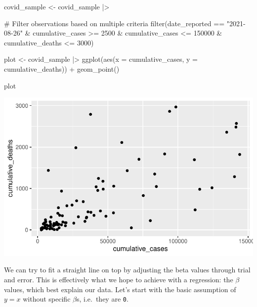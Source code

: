 \documentclass[
  letterpaper,
]{krantz}
\makeatletter
\newenvironment{Shaded}{\begin{snugshade}}{\end{snugshade}}
\newcommand{\AttributeTok}[1]{\textcolor[rgb]{0.40,0.45,0.13}{#1}}
\newcommand{\CommentTok}[1]{\textcolor[rgb]{0.37,0.37,0.37}{#1}}
\newcommand{\DecValTok}[1]{\textcolor[rgb]{0.68,0.00,0.00}{#1}}
\newcommand{\FunctionTok}[1]{\textcolor[rgb]{0.28,0.35,0.67}{#1}}
\newcommand{\NormalTok}[1]{\textcolor[rgb]{0.00,0.23,0.31}{#1}}
\newcommand{\OtherTok}[1]{\textcolor[rgb]{0.00,0.23,0.31}{#1}}
\newcommand{\SpecialCharTok}[1]{\textcolor[rgb]{0.37,0.37,0.37}{#1}}
\newcommand{\StringTok}[1]{\textcolor[rgb]{0.13,0.47,0.30}{#1}}
\newenvironment{kframe}{%
\medskip{}
\setlength{\fboxsep}{.8em}
 \def\at@end@of@kframe{}%
 \ifinner\ifhmode%
  \def\at@end@of@kframe{\end{minipage}}%
  \begin{minipage}{\columnwidth}%
 \fi\fi%
 \def\FrameCommand##1{\hskip\@totalleftmargin \hskip-\fboxsep
 \colorbox{shadecolor}{##1}\hskip-\fboxsep
     \hskip-\linewidth \hskip-\@totalleftmargin \hskip\columnwidth}%
 \MakeFramed {\advance\hsize-\width
   \@totalleftmargin\z@ \linewidth\hsize
   \@setminipage}}%
 {\par\unskip\endMakeFramed%
 \at@end@of@kframe}
\renewenvironment{Shaded}{\begin{kframe}}{\end{kframe}}
\makeatother
\begin{document}
\begin{Shaded}
\begin{Highlighting}[]
\NormalTok{covid\_sample }\OtherTok{\textless{}{-}}
\NormalTok{  covid\_sample }\SpecialCharTok{|\textgreater{}}
  
  \CommentTok{\# Filter observations based on multiple criteria}
  \FunctionTok{filter}\NormalTok{(date\_reported }\SpecialCharTok{==} \StringTok{"2021{-}08{-}26"} \SpecialCharTok{\&}
\NormalTok{           cumulative\_cases }\SpecialCharTok{\textgreater{}=} \DecValTok{2500} \SpecialCharTok{\&}
\NormalTok{           cumulative\_cases }\SpecialCharTok{\textless{}=} \DecValTok{150000} \SpecialCharTok{\&}
\NormalTok{           cumulative\_deaths }\SpecialCharTok{\textless{}=} \DecValTok{3000}\NormalTok{)}

\NormalTok{plot }\OtherTok{\textless{}{-}}\NormalTok{ covid\_sample }\SpecialCharTok{|\textgreater{}}
  \FunctionTok{ggplot}\NormalTok{(}\FunctionTok{aes}\NormalTok{(}\AttributeTok{x =}\NormalTok{ cumulative\_cases,}
             \AttributeTok{y =}\NormalTok{ cumulative\_deaths)) }\SpecialCharTok{+}
  \FunctionTok{geom\_point}\NormalTok{()}

\NormalTok{plot}
\end{Highlighting}
\end{Shaded}

\includegraphics{13_regressions_files/figure-latex/fitting-model-by hand-step-three-1.pdf}

We can try to fit a straight line on top by adjusting the beta values
through trial and error. This is effectively what we hope to achieve
with a regression: the \(\beta\) values, which best explain our data.
Let's start with the basic assumption of \(y = x\) without specific
\(\beta\)s, i.e.~they are \texttt{0}.
\end{document}
